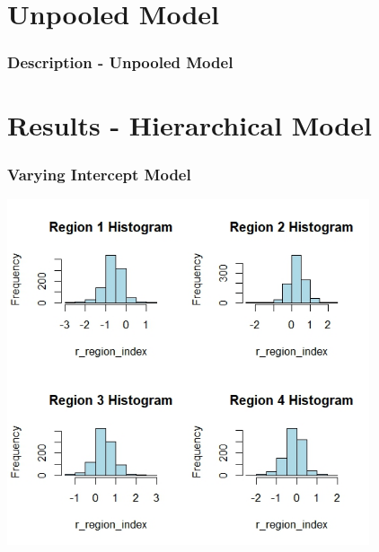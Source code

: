 \documentclass{beamer}
\begin{document}
\section{Unpooled Model}

\begin{frame}
\frametitle{Description - Unpooled Model}

\end{frame}

\section{Results - Hierarchical Model}

\begin{frame}
\frametitle{Varying Intercept Model}

\begin{center}
    \includegraphics[width=0.8\textwidth]{placeholder_hist_varying_intercept_1_level.jpeg}
\end{center}

\end{frame}
\end{document}
